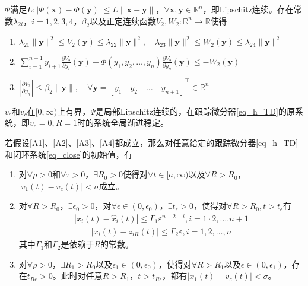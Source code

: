 \begin{assumption}
$ \Phi $满足$L:|\Phi(\bm{x})-\Phi(\bm{y})| \leq L\|\bm{x}-\bm{y}\|$，$ \forall \bm{x},\bm{y} \in \mathbb{R}^{n} $，即Lipschitz连续。存在常数$\lambda_{2 i}$，$i=1,2,3,4$，$\beta_{2}$以及正定连续函数$V_2, W_2: \mathbb{R}^{n} \rightarrow \mathbb{R}$使得
\begin{enumerate}
	\item $ \lambda_{21}\|\bm{y}\|^{2} \leq V_{2}(\bm{y}) \leq \lambda_{22}\|\bm{y}\|^{2}, \quad \lambda_{23}\|\bm{y}\|^{2} \leq W_{2}(\bm{y}) \leq \lambda_{24}\|\bm{y}\|^{2} $
	\item $ \sum_{i=1}^{n-1} y_{i+1} \frac{\partial V_{2}}{\partial y_{i}}(\bm{y})+\Phi\left(y_{1}, y_{2}, \ldots, y_{n}\right) \frac{\partial V_{2}}{\partial y_{n}}(\bm{y}) \leq-W_{2}(\bm{y}) $
	\item $|\frac{\partial V_{2}}{\partial y_{n}}| \leq \beta_{2}\|\bm{y}\|, \quad \forall \bm{y}=[y_{1} \quad y_{2} \quad \ldots \quad y_{n+1}]^\top \in \mathbb{R}^{n} $	
\end{enumerate}	\label{A3}
\end{assumption}

\begin{assumption}
$ v_c $和$ \dot{v}_c $在$ [0,\infty) $上有界，$ \Psi $是局部Lipschitz连续的，在跟踪微分器\eqref{eq_h_TD}的原系统，即$ v_c=0,R=1 $时的系统全局渐进稳定。\label{A4}
\end{assumption}
\begin{theorem}
	若假设\ref{A1}、\ref{A2}、\ref{A3}、\ref{A4}都成立，那么对任意给定的跟踪微分器\eqref{eq_h_TD}和闭环系统\ref{eq_close}的初始值，有
	\begin{enumerate}
		\item 对$ \forall \rho >0 $和$ \forall \tau >0 $，$ \exists R_0>0 $使得对$\forall t \in [a,\infty)$以及$ \forall R>R_0 $，$\left|v_{1}(t)-{v_c}(t)\right|<\sigma $成立。
		\item 对$ \forall R>R_0 $，$ \exists \epsilon_0>0 $，对$\forall \epsilon \in (0,\epsilon_0)$，$ \exists t_\epsilon >0 $，使得对$ \forall R>R_0 , t>t_\epsilon $有
		\begin{align}\left|x_{i}(t)-\hat{x}_{i}(t)\right| \leq \Gamma_{1} \varepsilon^{n+2-i}, i=1 \cdot 2, \ldots . n+1\end{align}
		\begin{align}\left|x_{i}(t)-z_{i R}(t)\right| \leq \Gamma_{2} \varepsilon, i=1,2, \ldots, n\end{align}
		其中$ \Gamma_{1} $和$ \Gamma_{2} $是依赖于$ R $的常数。
		\item 对$ \forall \rho >0 $，$\exists R_1>R_0$以及$ \epsilon_1 \in (0,\epsilon_0)$，使得对$  \forall R>R_1 $以及$ \epsilon \in (0,\epsilon_1) $，存在$ t_{R\epsilon}>0 $。此时对任意$ R>R_1 $，$ t> t_{R\epsilon} $，都有$\left|x_{1}(t)-v_c(t)\right|<\sigma$。
	\end{enumerate}	\label{the_close}
\end{theorem}
